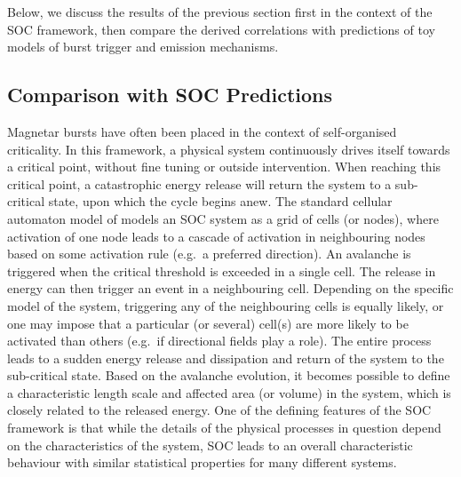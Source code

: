 \documentclass[12pt]{emulateapj}
\begin{document}
Below, we discuss the results of the previous section first in the context of the SOC framework, then compare the derived correlations with predictions of toy models of burst trigger and
emission mechanisms.

\subsection{Comparison with SOC Predictions}
\label{ch6:soc}

Magnetar bursts have often been placed in the context of self-organised criticality. In this framework, a physical system continuously drives
itself towards a critical point, without fine tuning or outside intervention. When reaching this critical point, a catastrophic energy
release will return the system to a sub-critical state, upon which the cycle begins anew. The standard cellular automaton model of \citet{bak1987} models an 
SOC system as a grid of cells (or nodes), where activation of one node leads to a cascade of activation in neighbouring nodes based on some activation rule 
(e.g.\ a preferred direction). An avalanche is triggered when the critical threshold is exceeded in a single cell. The release in energy can then trigger an event in a neighbouring cell. Depending
on the specific model of the system, triggering any of the neighbouring cells is equally likely, or one may impose that a particular (or several) cell(s) are more likely to be activated than others (e.g.\
if directional fields play a role).
The entire process leads to a sudden energy release and dissipation and return of the system to the sub-critical state.
Based on the avalanche evolution, it becomes possible to define a characteristic length scale and affected 
area (or volume) in the system, which is closely related to the released energy. 
One of the defining features of the SOC framework is that while the details of the physical processes in question depend on the characteristics
of the system, SOC leads to an overall characteristic behaviour with similar statistical properties for many different systems. 
\end{document}
